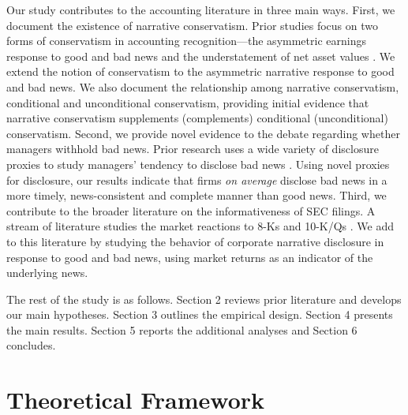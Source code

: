 \documentclass[letterpaper,12pt]{article}
\begin{document}
\begin{spacing}{1.5}
Our study contributes to the accounting literature in three main ways. First, we document the existence of narrative conservatism. Prior studies focus on two forms of conservatism in accounting recognition---the asymmetric earnings response to good and bad news and the understatement of net asset values \cite{basuConservatismPrincipleAsymmetric1997, ballEarningsQualityUK2005, beaverConditionalUnconditionalConservatism2005}. We extend the notion of conservatism to the asymmetric narrative response to good and bad news. We also document the relationship among narrative conservatism, conditional and unconditional conservatism, providing initial evidence that narrative conservatism supplements (complements) conditional (unconditional) conservatism.
Second, we provide novel evidence to the debate regarding whether managers withhold bad news. Prior research uses a wide variety of disclosure proxies to study managers' tendency to disclose bad news \cite{kasznikWarnNotWarn1995, kothariManagersWithholdBad2009, baoManagersDiscloseWithhold2019}. Using novel proxies for disclosure, our results indicate that firms \textit{on average} disclose bad news in a more timely, news-consistent and complete manner than good news. Third, we contribute to the broader literature on the informativeness of SEC filings. A stream of literature studies the market reactions to 8-Ks \cite{carterRelevanceForm8K1999, pinskerHasFirmsForm2006, lermanNewForm8K2010} and 10-K/Qs \cite{alfordExtensionsViolationsStatutory1994, liAnnualReportReadability2008, liInformationContentForwardLooking2010}. We add to this literature by studying the behavior of corporate narrative disclosure in response to good and bad news, using market returns as an indicator of the underlying news.

The rest of the study is as follows. Section 2 reviews prior literature and develops our main hypotheses. Section 3 outlines the empirical design. Section 4 presents the main results. Section 5 reports the additional analyses and Section 6 concludes.

\section{Theoretical Framework}

\end{spacing}
\end{document}
